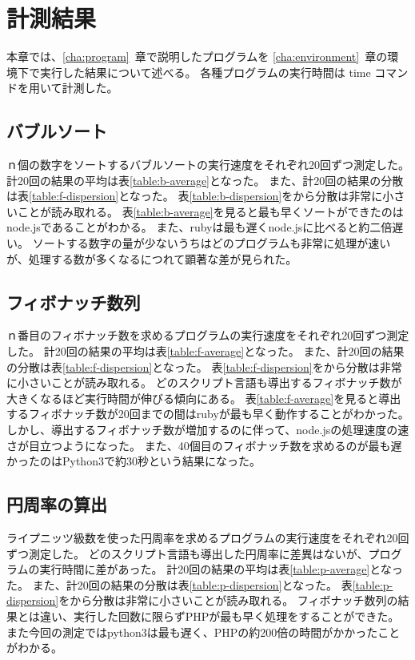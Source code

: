 \chapter{計測結果}
\label{cha:result}

本章では、\ref{cha:program}~章で説明したプログラムを \ref{cha:environment}~章の環境下で実行した結果について述べる。
各種プログラムの実行時間は time コマンドを用いて計測した。

\section{バブルソート}
\label{cha:result:bubble}

ｎ個の数字をソートするバブルソートの実行速度をそれぞれ20回ずつ測定した。
計20回の結果の平均は表\ref{table:b-average}となった。
また、計20回の結果の分散は表\ref{table:f-dispersion}となった。
表\ref{table:b-dispersion}をから分散は非常に小さいことが読み取れる。
表\ref{table:b-average}を見ると最も早くソートができたのはnode.jsであることがわかる。
また、rubyは最も遅くnode.jsに比べると約二倍遅い。
ソートする数字の量が少ないうちはどのプログラムも非常に処理が速いが、処理する数が多くなるにつれて顕著な差が見られた。

\section{フィボナッチ数列}
ｎ番目のフィボナッチ数を求めるプログラムの実行速度をそれぞれ20回ずつ測定した。
計20回の結果の平均は表\ref{table:f-average}となった。
また、計20回の結果の分散は表\ref{table:f-dispersion}となった。
表\ref{table:f-dispersion}をから分散は非常に小さいことが読み取れる。
どのスクリプト言語も導出するフィボナッチ数が大きくなるほど実行時間が伸びる傾向にある。
表\ref{table:f-average}を見ると導出するフィボナッチ数が20回までの間はrubyが最も早く動作することがわかった。
しかし、導出するフィボナッチ数が増加するのに伴って、node.jsの処理速度の速さが目立つようになった。
また、40個目のフィボナッチ数を求めるのが最も遅かったのはPython3で約30秒という結果になった。


\section{円周率の算出}
ライプニッツ級数を使った円周率を求めるプログラムの実行速度をそれぞれ20回ずつ測定した。
どのスクリプト言語も導出した円周率に差異はないが、プログラムの実行時間に差があった。
計20回の結果の平均は表\ref{table:p-average}となった。
また、計20回の結果の分散は表\ref{table:p-dispersion}となった。
表\ref{table:p-dispersion}をから分散は非常に小さいことが読み取れる。
フィボナッチ数列の結果とは違い、実行した回数に限らずPHPが最も早く処理をすることができた。
また今回の測定ではpython3は最も遅く、PHPの約200倍の時間がかかったことがわかる。

